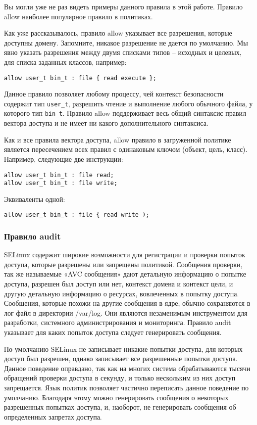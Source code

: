 \documentclass{./../class/UIR}
\begin{document}
    Вы могли уже не раз видеть примеры данного правила в этой работе. Правило
    allow наиболее популярное правило в политиках.

    Как уже рассказывалось, правило allow указывает все разрешения, которые
    доступны домену. Запомните, никакое разрешение не дается по умолчанию. Мы
    явно указать разрешения между двумя списками типов – исходных и целевых, для
    списка заданных классов, например:
\begin{verbatim}
allow user_t bin_t : file { read execute };
\end{verbatim}
    Данное правило позволяет любому процессу, чей контекст безопасности
    содержит тип \verb"user_t", разрешить чтение и выполнение любого обычного
    файла, у которого тип \verb"bin_t". Правило allow поддерживает весь общий
    синтаксис правил вектора доступа и не имеет ни какого дополнительного синтаксиса.

    Как и все правила вектора доступа, allow правило в загруженной политике
    является пересечением всех правил с одинаковым ключом (объект, цель, класс).
    Например, следующие две инструкции:
\begin{verbatim}
allow user_t bin_t : file read;
allow user_t bin_t : file write;
\end{verbatim}
Эквиваленты одной:
\begin{verbatim}
allow user_t bin_t : file { read write );
\end{verbatim}
\subsubsection{Правило audit}

    SELinux содержит широкие возможности для регистрации и проверки попыток
    доступа, которые разрешены или запрещены политикой. Сообщения проверки, так
    же называемые «AVC сообщения» дают детальную информацию о попытке доступа,
    разрешен был доступ или нет, контекст домена и контекст цели, и другую
    детальную информацию о ресурсах, вовлеченных в попытку доступа. Сообщения,
    которые похожи на другие сообщения в ядре, обычно сохраняются в лог файл в
    директории /var/log. Они являются незаменимым инструментом для разработки,
    системного администрирования и мониторинга. Правило audit указывает для
    каких попыток доступа следует генерировать сообщения.

    По умолчанию SELinux не записывает никакие попытки доступа, для которых
    доступ был разрешен, однако записывает все разрешенные попытки доступа.
    Данное поведение оправдано, так как на многих система обрабатываются тысячи
    обращений проверки доступа в секунду, и только нескольким из них доступ
    запрещается. Язык политик позволяет частично переписать данное поведение по
    умолчанию. Благодаря этому можно генерировать сообщения о некоторых
    разрешенных попытках доступа, и, наоборот, не генерировать сообщения об
    определенных запретах доступа.
\end{document}
